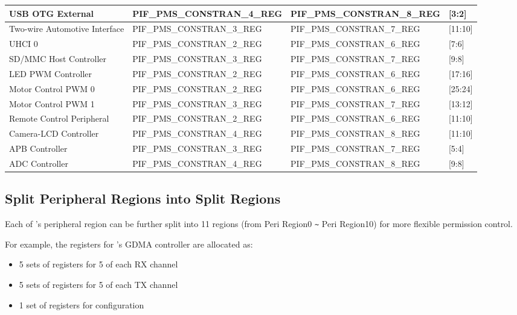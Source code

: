 \documentclass[main\_\_EN.tex]{subfiles}
\begin{document}
\begin{ThreePartTable}
\begin{longtable}[c]{ |l|l|l|l| }
    USB OTG External & PIF\_PMS\_CONSTRAN\_4\_REG & PIF\_PMS\_CONSTRAN\_8\_REG & [3:2] \\\hline
    Two-wire Automotive Interface & PIF\_PMS\_CONSTRAN\_3\_REG & PIF\_PMS\_CONSTRAN\_7\_REG & [11:10] \\\hline
    UHCI 0  & PIF\_PMS\_CONSTRAN\_2\_REG & PIF\_PMS\_CONSTRAN\_6\_REG & [7:6] \\\hline
    SD/MMC Host Controller & PIF\_PMS\_CONSTRAN\_3\_REG & PIF\_PMS\_CONSTRAN\_7\_REG & [9:8] \\\hline
    LED PWM Controller  & PIF\_PMS\_CONSTRAN\_2\_REG & PIF\_PMS\_CONSTRAN\_6\_REG & [17:16] \\\hline
    Motor Control PWM 0 & PIF\_PMS\_CONSTRAN\_2\_REG & PIF\_PMS\_CONSTRAN\_6\_REG & [25:24] \\\hline
    Motor Control PWM 1 & PIF\_PMS\_CONSTRAN\_3\_REG & PIF\_PMS\_CONSTRAN\_7\_REG & [13:12] \\\hline
    Remote Control Peripheral  & PIF\_PMS\_CONSTRAN\_2\_REG & PIF\_PMS\_CONSTRAN\_6\_REG & [11:10] \\\hline
    Camera-LCD Controller & PIF\_PMS\_CONSTRAN\_4\_REG & PIF\_PMS\_CONSTRAN\_8\_REG & [11:10] \\\hline
    APB Controller & PIF\_PMS\_CONSTRAN\_3\_REG & PIF\_PMS\_CONSTRAN\_7\_REG & [5:4] \\\hline
    ADC Controller & PIF\_PMS\_CONSTRAN\_4\_REG & PIF\_PMS\_CONSTRAN\_8\_REG & [9:8] \\\hline
\end{longtable}
\end{ThreePartTable}


\subsection{Split Peripheral Regions into Split Regions}

Each of \chipname{}'s peripheral region can be further split into 11 regions (from Peri Region0 \verb+~+ Peri Region10) for more flexible permission control.

For example, the registers for \chipname{}'s GDMA controller are allocated as:
\begin{itemize}
    \item 5 sets of registers for 5 of each RX channel
    \item 5 sets of registers for 5 of each TX channel
    \item 1 set of registers for configuration
\end{itemize}
\end{document}
